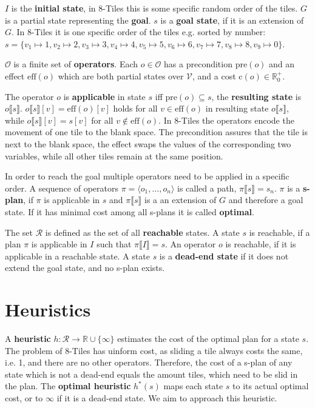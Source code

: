 $I$ is the \textbf{initial state}, in 8-Tiles this is some specific random order of the tiles.
$G$ is a partial state representing the \textbf{goal}. $s$ is a \textbf{goal state}, if it is an extension of $G$.
In 8-Tiles it is one specific order of the tiles e.g. sorted by number:
$s = \{v_1\mapsto1, v_2\mapsto2, v_3\mapsto3, v_4\mapsto4, v_5\mapsto5, v_6\mapsto6, v_7\mapsto7, v_8\mapsto8, v_9\mapsto0\}$.

$\mathcal{O}$ is a finite set of \textbf{operators}.
Each $o\in\mathcal{O}$ has a precondition $\text{pre}(o)$ and an effect $\text{eff}(o)$ which are both partial states over $\mathcal{V}$, and a cost $\text{c}(o)\in\mathbb{R}^+_0$.

The operator $o$ is \textbf{applicable} in state $s$ iff $\text{pre}(o)\subseteq s$, the \textbf{resulting state} is $o\llbracket s\rrbracket$.
$o\llbracket s\rrbracket[v] = \text{eff}(o)[v]$ holds for all $v\in \text{eff}(o)$ in resulting state $o\llbracket s\rrbracket$, while $o\llbracket s\rrbracket[v]=s[v]$ for all $v\notin \text{eff}(o)$. 
In 8-Tiles the operators encode the movement of one tile to the blank space.
The precondition assures that the tile is next to the blank space, the effect swaps the values of the corresponding two variables, while all other tiles remain at the same position.

In order to reach the goal multiple operators need to be applied in a specific order.
A sequence of operators $\pi=\langle o_1,\dots, o_n\rangle$ is called a path, $\pi\llbracket s\rrbracket = s_n$.
$\pi$ is a \textbf{s-plan}, if $\pi$ is applicable in $s$ and $\pi\llbracket s\rrbracket$ is a an extension of $G$ and therefore a goal state.
If it has minimal cost among all s-plans it is called \textbf{optimal}.

The set $\mathcal{R}$ is defined as the set of all \textbf{reachable} states.
A state $s$ is reachable, if a plan $\pi$ is applicable in $I$ such that $\pi\llbracket I\rrbracket = s$.
An operator $o$ is reachable, if it is applicable in a reachable state.
A state $s$ is a \textbf{dead-end state} if it does not extend the goal state, and no s-plan exists.


\section{Heuristics}\label{sec:heuristics}
A \textbf{heuristic} $h:\mathcal{R} \rightarrow \mathbb{R} \cup \{\infty\} $ estimates the cost of the optimal plan for a state $s$.
The problem of 8-Tiles has uinform cost, as sliding a tile always costs the same, i.e. 1, and there are no other operators.
Therefore, the cost of a s-plan of any state which is not a dead-end equals the amount tiles, which need to be slid in the plan.
The \textbf{optimal heuristic} $h^*(s)$ maps each state $s$  to its actual optimal cost, or to $\infty$ if it is a dead-end state.
We aim to approach this heuristic.

